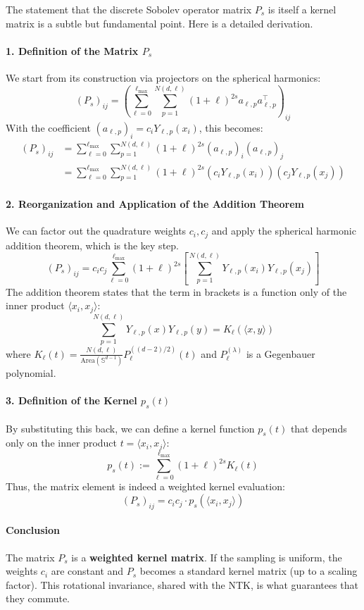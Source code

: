 \documentclass[a4paper]{article}
\begin{document}
\begin{remark}
The statement that the discrete Sobolev operator matrix $P_s$ is itself a kernel matrix is a subtle but fundamental point. Here is a detailed derivation.

\paragraph{1. Definition of the Matrix $P_s$}
We start from its construction via projectors on the spherical harmonics:
\[
(P_s)_{ij} = \left( \sum_{\ell=0}^{\ell_{\max}} \sum_{p=1}^{N(d,\ell)} (1+\ell)^{2s} a_{\ell,p}a_{\ell,p}^\top \right)_{ij}
\]
With the coefficient $(a_{\ell,p})_i = c_i Y_{\ell,p}(x_i)$, this becomes:
\begin{align*}
(P_s)_{ij} &= \sum_{\ell=0}^{\ell_{\max}} \sum_{p=1}^{N(d,\ell)} (1+\ell)^{2s} (a_{\ell,p})_i (a_{\ell,p})_j \\
&= \sum_{\ell=0}^{\ell_{\max}} \sum_{p=1}^{N(d,\ell)} (1+\ell)^{2s} (c_i Y_{\ell,p}(x_i)) (c_j Y_{\ell,p}(x_j))
\end{align*}

\paragraph{2. Reorganization and Application of the Addition Theorem}
We can factor out the quadrature weights $c_i, c_j$ and apply the spherical harmonic addition theorem, which is the key step.
\[
(P_s)_{ij} = c_i c_j \sum_{\ell=0}^{\ell_{\max}} (1+\ell)^{2s} \left[ \sum_{p=1}^{N(d,\ell)} Y_{\ell,p}(x_i) Y_{\ell,p}(x_j) \right]
\]
The addition theorem states that the term in brackets is a function only of the inner product $\langle x_i, x_j \rangle$:
\[
\sum_{p=1}^{N(d,\ell)} Y_{\ell,p}(x) Y_{\ell,p}(y) = K_\ell(\langle x, y \rangle)
\]
where $K_\ell(t) = \frac{N(d,\ell)}{\text{Area}(\mathbb{S}^{d-1})} P_\ell^{((d-2)/2)}(t)$ and $P_\ell^{(\lambda)}$ is a Gegenbauer polynomial.

\paragraph{3. Definition of the Kernel $p_s(t)$}
By substituting this back, we can define a kernel function $p_s(t)$ that depends only on the inner product $t = \langle x_i, x_j \rangle$:
\[
p_s(t) := \sum_{\ell=0}^{\ell_{\max}} (1+\ell)^{2s} K_\ell(t)
\]
Thus, the matrix element is indeed a weighted kernel evaluation:
\[
(P_s)_{ij} = c_i c_j \cdot p_s(\langle x_i, x_j \rangle)
\]

\paragraph{Conclusion}
The matrix $P_s$ is a \textbf{weighted kernel matrix}. If the sampling is uniform, the weights $c_i$ are constant and $P_s$ becomes a standard kernel matrix (up to a scaling factor). This rotational invariance, shared with the NTK, is what guarantees that they commute.
\end{remark}
\end{document}
